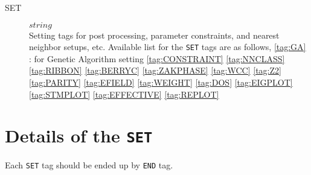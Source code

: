 \documentclass[a4paper,12pt]{scrartcl}
\makeatletter
\def\namedlabel#1#2{\begingroup
    #2%
    \def\@currentlabel{#2}%
    \phantomsection\label{#1}\endgroup
}
\makeatother
\begin{document}
\begin{description}
       
    \item[\namedlabel{tag:SET}{SET}] $string$ \\
        Setting tags for post processing, parameter constraints,
		and nearest neighbor setups, etc.
		Available list for the \texttt{SET} tags are as follows,
	\subitem \ref{tag:GA} : for Genetic Algorithm setting
 	\subitem \ref{tag:CONSTRAINT}
 	\subitem \ref{tag:NNCLASS}
 	\subitem \ref{tag:RIBBON}
 	\subitem \ref{tag:BERRYC}
 	\subitem \ref{tag:ZAKPHASE}
 	\subitem \ref{tag:WCC}
 	\subitem \ref{tag:Z2}
  	\subitem \ref{tag:PARITY}	
 	\subitem \ref{tag:EFIELD}
 	\subitem \ref{tag:WEIGHT}
 	\subitem \ref{tag:DOS}
 	\subitem \ref{tag:EIGPLOT}
 	\subitem \ref{tag:STMPLOT}
 	\subitem \ref{tag:EFFECTIVE}
 	\subitem \ref{tag:REPLOT}

\end{description}


\newpage

\section{Details of the \texttt{SET}}\label{tag:SET-detail}
Each \texttt{SET} tag should be ended up by \texttt{END} tag.
\end{document}
